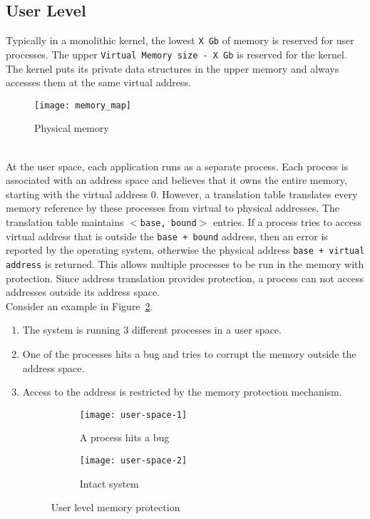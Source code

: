 \subsection{User Level}
\label{subsec:user level}
Typically in a monolithic kernel, the lowest \texttt{X Gb} of memory is reserved for user processes. The upper \texttt{Virtual Memory size - X Gb} is reserved for the kernel. The kernel puts its private data structures in the upper memory and always accesses them at the same virtual address. 
\begin{figure}[!ht]
\centering
\texttt{[image: memory\_map]}
\caption{Physical memory}
\label{fig:memmap}
\end{figure}
\\[3mm]
At the user space, each application runs as a separate process. Each process is associated with an address space and believes that it owns the entire memory, starting with the virtual address 0. However, a translation table translates every memory reference by these processes from virtual to physical addresses. The translation table maintains \texttt{$<$base, bound$>$} entries. If a process tries to access virtual address that is outside the \texttt{base + bound} address, then an error is reported by the operating system, otherwise the physical address \texttt{base + virtual address} is returned. This allows multiple processes to be run in the memory with protection. Since address translation provides protection, a process can not access addresses outside its address space.
\\[3mm]
Consider an example in Figure~\ref{fig:User space}.
\begin{enumerate}
\item The system is running 3 different processes in a user space.
\item One of the processes hits a bug and tries to corrupt the memory outside the address space.
\item Access to the address is restricted by the memory protection mechanism.
\begin{figure}[!ht]
    \centering
    \begin{subfigure}[b]{0.49\textwidth}
	\texttt{[image: user-space-1]}
	\caption{A process hits a bug}
    \end{subfigure}
	\hfill
    \begin{subfigure}[b]{0.49\textwidth}
	\texttt{[image: user-space-2]}
	\caption{Intact system}
    \end{subfigure}
    \caption{User level memory protection}\label{fig:User space}
\end{figure}
\end{enumerate}

